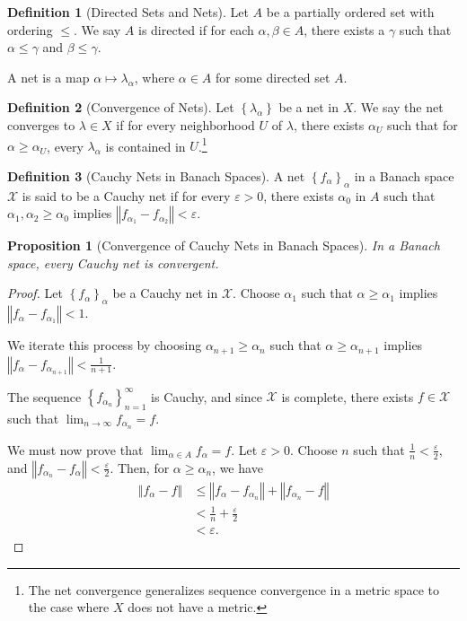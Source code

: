 \documentclass[12pt]{extarticle}
\newcommand{\norm}[1]{\left\Vert #1\right\Vert}
\newcommand{\set}[1]{\left\{#1\right\}}
\newcommand{\ve}{\varepsilon}
\theoremstyle{plain}
\newtheorem*{proposition}{Proposition}
\theoremstyle{definition}
\newtheorem*{definition}{Definition}
\theoremstyle{note}
\renewcommand{\newline}{\hfill\break}
\begin{document}
\begin{definition}[Directed Sets and Nets]
  Let $A$ be a partially ordered set with ordering $\leq$. We say $A$ is directed if for each $\alpha,\beta \in A$, there exists a $\gamma$ such that $\alpha \leq \gamma$ and $\beta \leq \gamma$.\newline

  A net is a map $\alpha \mapsto \lambda_{\alpha}$, where $\alpha\in A$ for some directed set $A$. 
\end{definition}
\begin{definition}[Convergence of Nets]
  Let $\set{\lambda_{\alpha}}$ be a net in $X$. We say the net converges to $\lambda \in X$ if for every neighborhood $U$ of $\lambda$, there exists $\alpha_{U}$ such that for $\alpha \geq \alpha_U$, every $\lambda_{\alpha}$ is contained in $U$.\footnote{The net convergence generalizes sequence convergence in a metric space to the case where $X$ does not have a metric.}
\end{definition}
\begin{definition}[Cauchy Nets in Banach Spaces]
  A net $\set{f_{\alpha}}_{\alpha}$ in a Banach space $\mathcal{X}$ is said to be a Cauchy net if for every $\ve > 0$, there exists $\alpha_0$ in $A$ such that $\alpha_1,\alpha_2 \geq \alpha_0$ implies $\norm{f_{\alpha_1} -f_{\alpha_2}} < \ve$.
\end{definition}
\begin{proposition}[Convergence of Cauchy Nets in Banach Spaces]
In a Banach space, every Cauchy net is convergent.
\end{proposition}
\begin{proof}
  Let $\set{f_{\alpha}}_{\alpha}$ be a Cauchy net in $\mathcal{X}$. Choose $\alpha_1$ such that $\alpha \geq \alpha_1$ implies $\norm{f_{\alpha} - f_{\alpha_1}} < 1$.\newline

  We iterate this process by choosing $\alpha_{n+1}\geq \alpha_n$ such that $\alpha \geq \alpha_{n+1}$ implies  $\norm{f_{\alpha} - f_{\alpha_{n+1}}} < \frac{1}{n+1}$.\newline

  The sequence $\set{f_{\alpha_n}}_{n=1}^{\infty}$ is Cauchy, and since $\mathcal{X}$ is complete, there exists $f\in \mathcal{X}$ such that $\lim_{n\rightarrow\infty} f_{\alpha_n} = f$.\newline

  We must now prove that $\lim_{\alpha\in A}f_{\alpha} = f$. Let $\ve > 0$. Choose $n$ such that $\frac{1}{n} < \frac{\ve}{2}$, and $\norm{f_{\alpha_n} - f_{\alpha}} < \frac{\ve}{2}$. Then, for $\alpha \geq \alpha_n$, we have
  \begin{align*}
    \norm{f_{\alpha} - f} &\leq \norm{f_{\alpha} - f_{\alpha_n}} + \norm{f_{\alpha_n} - f}\\
                          &< \frac{1}{n} + \frac{\ve}{2}\\
                          &< \ve.
  \end{align*}
\end{proof}
\end{document}
